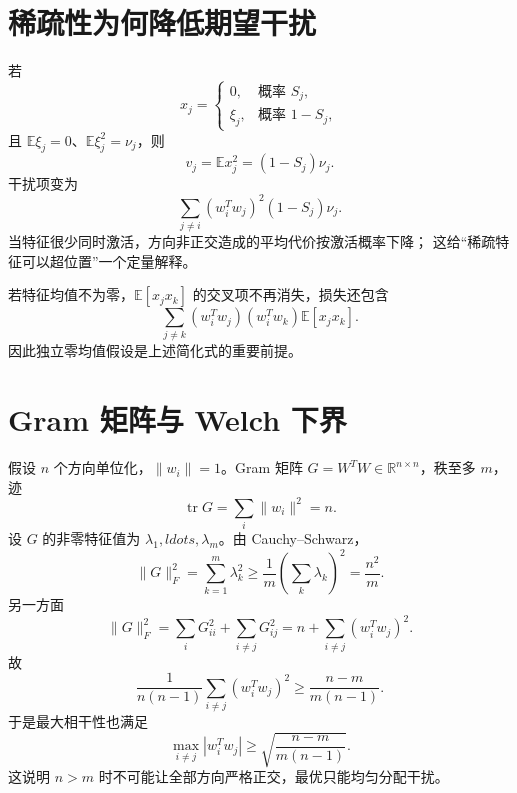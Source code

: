 \documentclass[11pt]{article}
\numberwithin{equation}{section}
\newcommand{\R}{\mathbb{R}}
\newcommand{\E}{\mathbb{E}}
\newcommand{\1}{\mathbf{1}}
\newcommand{\tr}{\operatorname{tr}}
\begin{document}
\section{稀疏性为何降低期望干扰}

若
\begin{equation}
 x_j=\begin{cases}
 0,&\text{概率 }S_j,\\
 \xi_j,&\text{概率 }1-S_j,
 \end{cases}
\end{equation}
且 $\E\xi_j=0$、$\E\xi_j^2=\nu_j$，则
\begin{equation}
 v_j=\E x_j^2=(1-S_j)\nu_j.
\end{equation}
干扰项变为
\begin{equation}
 \sum_{j\ne i}(w_i^Tw_j)^2(1-S_j)\nu_j.
\end{equation}
当特征很少同时激活，方向非正交造成的平均代价按激活概率下降；
这给“稀疏特征可以超位置”一个定量解释。

若特征均值不为零，$\E[x_jx_k]$ 的交叉项不再消失，损失还包含
\begin{equation}
 \sum_{j\ne k}(w_i^Tw_j)(w_i^Tw_k)\E[x_jx_k].
\end{equation}
因此独立零均值假设是上述简化式的重要前提。

\section{Gram 矩阵与 Welch 下界}

假设 $n$ 个方向单位化，$\|w_i\|=1$。Gram 矩阵
$G=W^TW\in\R^{n\times n}$，秩至多 $m$，迹
\begin{equation}
 \tr G=\sum_i\|w_i\|^2=n.
\end{equation}
设 $G$ 的非零特征值为 $\lambda_1,ldots,\lambda_m$。由 Cauchy--Schwarz，
\begin{equation}
 \|G\|_F^2=\sum_{k=1}^{m}\lambda_k^2
 \ge\frac1m\left(\sum_k\lambda_k\right)^2
 =\frac{n^2}{m}.
\end{equation}
另一方面
\begin{equation}
 \|G\|_F^2=\sum_iG_{ii}^2+\sum_{i\ne j}G_{ij}^2
 =n+\sum_{i\ne j}(w_i^Tw_j)^2.
\end{equation}
故
\begin{equation}
 \boxed{\frac1{n(n-1)}\sum_{i\ne j}(w_i^Tw_j)^2
 \ge\frac{n-m}{m(n-1)}.}
\end{equation}
于是最大相干性也满足
\begin{equation}
 \max_{i\ne j}|w_i^Tw_j|
 \ge\sqrt{\frac{n-m}{m(n-1)}}.
\end{equation}
这说明 $n>m$ 时不可能让全部方向严格正交，最优只能均匀分配干扰。
\end{document}
